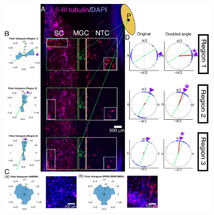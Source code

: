 \documentclass[review]{elsarticle}
\begin{document}
\begin{figure}
	\begin{center}
		\includegraphics[width=11cm]{Fig_10.jpg}
	\end{center}

\end{figure}
\end{document}

